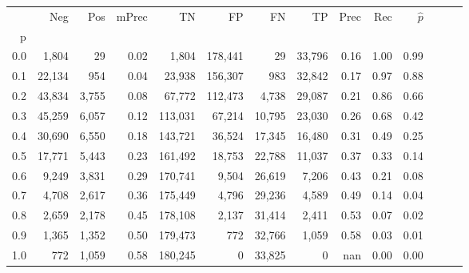 \begin{tabular}{rrrrrrrrrrrrrr}
\toprule
{} &     Neg &    Pos & mPrec &       TN &       FP &      FN &      TP &  Prec &   Rec & $\hat{p}$ \\
p   &         &        &       &          &          &         &         &       &       &           \\
\midrule
0.0 &   1,804 &     29 &  0.02 &    1,804 &  178,441 &      29 &  33,796 &  0.16 &  1.00 &      0.99 \\
0.1 &  22,134 &    954 &  0.04 &   23,938 &  156,307 &     983 &  32,842 &  0.17 &  0.97 &      0.88 \\
0.2 &  43,834 &  3,755 &  0.08 &   67,772 &  112,473 &   4,738 &  29,087 &  0.21 &  0.86 &      0.66 \\
0.3 &  45,259 &  6,057 &  0.12 &  113,031 &   67,214 &  10,795 &  23,030 &  0.26 &  0.68 &      0.42 \\
0.4 &  30,690 &  6,550 &  0.18 &  143,721 &   36,524 &  17,345 &  16,480 &  0.31 &  0.49 &      0.25 \\
0.5 &  17,771 &  5,443 &  0.23 &  161,492 &   18,753 &  22,788 &  11,037 &  0.37 &  0.33 &      0.14 \\
0.6 &   9,249 &  3,831 &  0.29 &  170,741 &    9,504 &  26,619 &   7,206 &  0.43 &  0.21 &      0.08 \\
0.7 &   4,708 &  2,617 &  0.36 &  175,449 &    4,796 &  29,236 &   4,589 &  0.49 &  0.14 &      0.04 \\
0.8 &   2,659 &  2,178 &  0.45 &  178,108 &    2,137 &  31,414 &   2,411 &  0.53 &  0.07 &      0.02 \\
0.9 &   1,365 &  1,352 &  0.50 &  179,473 &      772 &  32,766 &   1,059 &  0.58 &  0.03 &      0.01 \\
1.0 &     772 &  1,059 &  0.58 &  180,245 &        0 &  33,825 &       0 &   nan &  0.00 &      0.00 \\
\bottomrule
\end{tabular}

